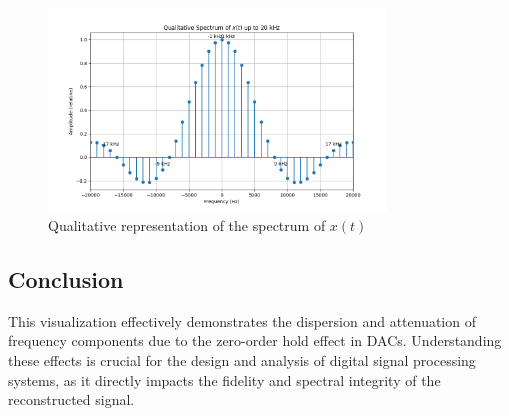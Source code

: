 \begin{figure}[h]
    \centering
    \includegraphics[width=0.8\textwidth]{fig/ex3_task_c_spectrum}
    \caption{Qualitative representation of the spectrum of \(x(t)\)}
    \label{fig:exercise3c_spectrum}
\end{figure}

\subsection*{Conclusion}
This visualization effectively demonstrates the dispersion and attenuation of frequency components due to the zero-order hold effect in DACs.
Understanding these effects is crucial for the design and analysis of digital signal processing systems, as it directly impacts the fidelity and spectral integrity of the reconstructed signal.

